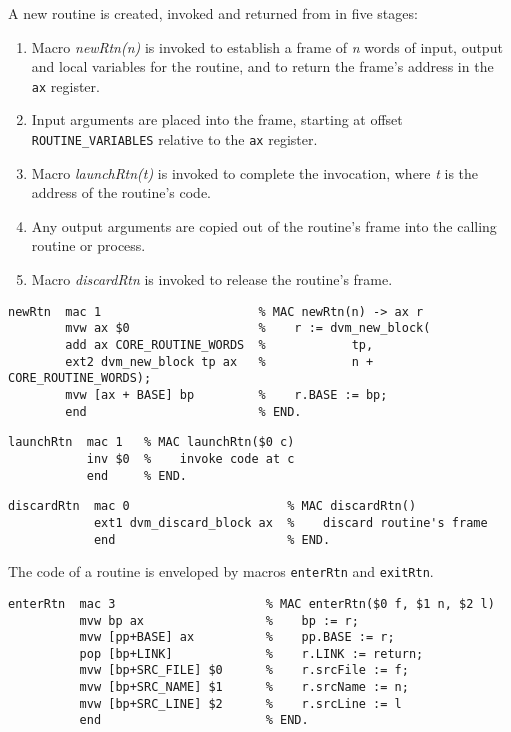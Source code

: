 A new routine is created, invoked and returned from in five stages:
\begin{enumerate}
	\item Macro \textit{newRtn(n)} is invoked to establish a frame of \textit{n} words of input, output and local variables for the routine, and to return the frame's address in the \texttt{ax} register.
   \item Input arguments are placed into the frame, starting at offset \texttt{\small ROUTINE\_VARIABLES} relative to the \texttt{ax} register.
   \item Macro \textit{launchRtn(t)} is invoked to complete the invocation, where \textit{t} is the address of the routine's code.
   \item Any output arguments are copied out of the routine's frame into the calling routine or process.
   \item Macro \textit{discardRtn} is invoked to release the routine's frame.
\end{enumerate}

{\small
\begin{verbatim}
newRtn  mac 1                      % MAC newRtn(n) -> ax r
        mvw ax $0                  %    r := dvm_new_block(
        add ax CORE_ROUTINE_WORDS  %            tp,
        ext2 dvm_new_block tp ax   %            n + CORE_ROUTINE_WORDS);
        mvw [ax + BASE] bp         %    r.BASE := bp;
        end                        % END.
\end{verbatim}}

{\small
\begin{verbatim}
launchRtn  mac 1   % MAC launchRtn($0 c)
           inv $0  %    invoke code at c
           end     % END.
\end{verbatim}}

{\small
\begin{verbatim}
discardRtn  mac 0                      % MAC discardRtn()
            ext1 dvm_discard_block ax  %    discard routine's frame
            end                        % END.
\end{verbatim}}

The code of a routine is enveloped by macros \texttt{enterRtn} and \texttt{exitRtn}.

{\small
\begin{verbatim}
enterRtn  mac 3                     % MAC enterRtn($0 f, $1 n, $2 l)
          mvw bp ax                 %    bp := r;
          mvw [pp+BASE] ax          %    pp.BASE := r;
          pop [bp+LINK]             %    r.LINK := return;
          mvw [bp+SRC_FILE] $0      %    r.srcFile := f;
          mvw [bp+SRC_NAME] $1      %    r.srcName := n;
          mvw [bp+SRC_LINE] $2      %    r.srcLine := l
          end                       % END.
\end{verbatim}}

